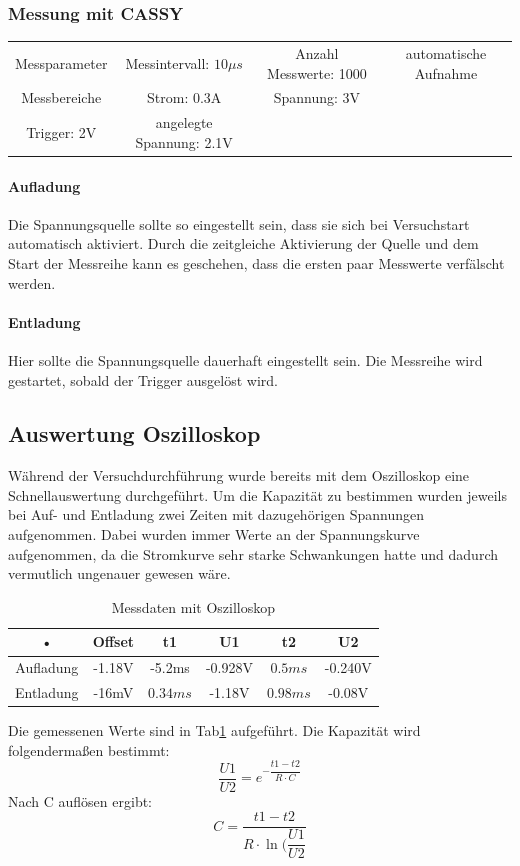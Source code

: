 \documentclass[12pt,a4paper]{article}
\begin{document}
\subsubsection{Messung mit CASSY}
\begin{tabular}{c c c c}
Messparameter & Messintervall: $10\mu s$  & Anzahl Messwerte: 1000 & automatische Aufnahme \\ 
Messbereiche & Strom: 0.3A & Spannung: 3V \\
Trigger: 2V & angelegte Spannung: 2.1V\\
\end{tabular} 
\paragraph{Aufladung}
Die Spannungsquelle sollte so eingestellt sein, dass sie sich bei Versuchstart automatisch aktiviert. Durch die zeitgleiche Aktivierung der Quelle und dem Start der Messreihe kann es geschehen, dass die ersten paar Messwerte verfälscht werden.
\paragraph{Entladung}
Hier sollte die Spannungsquelle dauerhaft eingestellt sein. Die Messreihe wird gestartet, sobald der Trigger ausgelöst wird.
\newpage
\subsection{Auswertung Oszilloskop}
Während der Versuchdurchführung wurde bereits mit dem Oszilloskop eine Schnellauswertung durchgeführt.
Um die Kapazität zu bestimmen wurden jeweils bei Auf- und Entladung zwei Zeiten mit dazugehörigen Spannungen aufgenommen. Dabei wurden immer Werte an der Spannungskurve aufgenommen, da die Stromkurve sehr starke Schwankungen hatte und dadurch vermutlich ungenauer gewesen wäre.\\
\begin{table}[H]
\begin{center}
\begin{tabular}{|c|c|c|c|c|c|}
\hline 
• & Offset & t1 & U1 & t2 & U2 \\ 
\hline 
Aufladung & -1.18V & -5.2ms & -0.928V & $0.5ms$ & -0.240V \\ 
\hline 
Entladung & -16mV & $0.34ms$ & -1.18V & $0.98ms$ & -0.08V \\ 
\hline 
\end{tabular} 
\end{center}
\label{tab:Kond_Osz}
\caption{Messdaten mit Oszilloskop}
\end{table}
Die gemessenen Werte sind in Tab\ref{tab:Kond_Osz} aufgeführt. Die Kapazität wird folgendermaßen bestimmt:
\begin{equation}
\dfrac{U1}{U2} = e^{-\dfrac{t1-t2}{R\cdot C}}
\end{equation}
Nach C auflösen ergibt:
\begin{equation}
C = \dfrac{t1-t2}{R\cdot \ln(\dfrac{U1}{U2}}
\end{equation}
\end{document}
